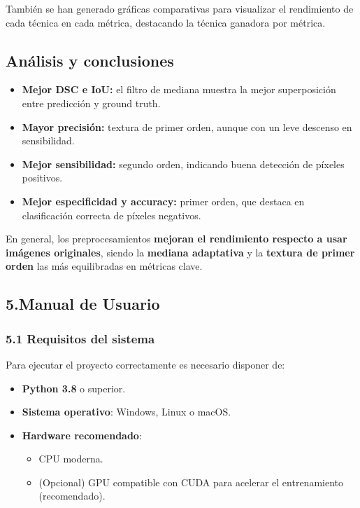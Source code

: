 \documentclass[12pt]{article}
\begin{document}
También se han generado gráficas comparativas para visualizar el rendimiento de cada técnica en cada métrica, destacando la técnica ganadora por métrica.

\subsection{Análisis y conclusiones}
\begin{itemize}
    \item \textbf{Mejor DSC e IoU:} el filtro de mediana muestra la mejor superposición entre predicción y ground truth.
    \item \textbf{Mayor precisión:} textura de primer orden, aunque con un leve descenso en sensibilidad.
    \item \textbf{Mejor sensibilidad:} segundo orden, indicando buena detección de píxeles positivos.
    \item \textbf{Mejor especificidad y accuracy:} primer orden, que destaca en clasificación correcta de píxeles negativos.
\end{itemize}

En general, los preprocesamientos \textbf{mejoran el rendimiento respecto a usar imágenes originales}, siendo la \textbf{mediana adaptativa} y la \textbf{textura de primer orden} las más equilibradas en métricas clave.


\subsection*{5.Manual de Usuario}
\subsubsection*{5.1 Requisitos del sistema}
Para ejecutar el proyecto correctamente es necesario disponer de:

\begin{itemize}
    \item \textbf{Python 3.8} o superior.
    \item \textbf{Sistema operativo}: Windows, Linux o macOS.
    \item \textbf{Hardware recomendado}:
    \begin{itemize}
        \item CPU moderna.
        \item (Opcional) GPU compatible con CUDA para acelerar el entrenamiento (recomendado).
    \end{itemize}
\end{itemize}
\end{document}
